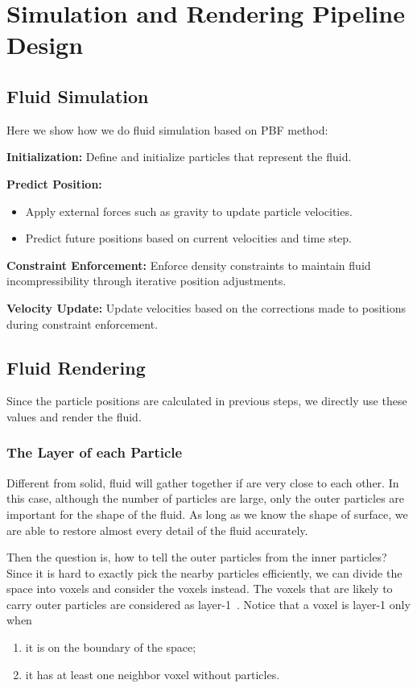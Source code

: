 \documentclass[sigconf]{acmart}
\begin{document}
\section{Simulation and Rendering Pipeline Design}

\subsection{Fluid Simulation}
\label{fluid-simulation}
Here we show how we do fluid simulation based on PBF method:

\textbf{Initialization:} Define and initialize particles that represent the fluid.

\textbf{Predict Position:}
\begin{itemize}
    \item Apply external forces such as gravity to update particle velocities.
    \item Predict future positions based on current velocities and time step.
\end{itemize}

\textbf{Constraint Enforcement:}
 Enforce density constraints to maintain fluid incompressibility through iterative position adjustments.

\textbf{Velocity Update:}
Update velocities based on the corrections made to positions during constraint enforcement.

\subsection{Fluid Rendering}
Since the particle positions are calculated in previous steps, we directly use these values and render the fluid.

\subsubsection{The Layer of each Particle}
Different from solid, fluid will gather together if are very close to each other. In this case, although the number of particles are large, only the outer particles are important for the shape of the fluid. As long as we know the shape of surface, we are able to restore almost every detail of the fluid accurately.

Then the question is, how to tell the outer particles from the inner particles? Since it is hard to exactly pick the nearby particles efficiently, we can divide the space into voxels and consider the voxels instead. The voxels that are likely to carry outer particles are considered as layer-1~\cite{oliveira2022narrow}. Notice that a voxel is layer-1 only when
\begin{enumerate}
\item it is on the boundary of the space;
\item it has at least one neighbor voxel without particles.
\end{enumerate}
\end{document}

